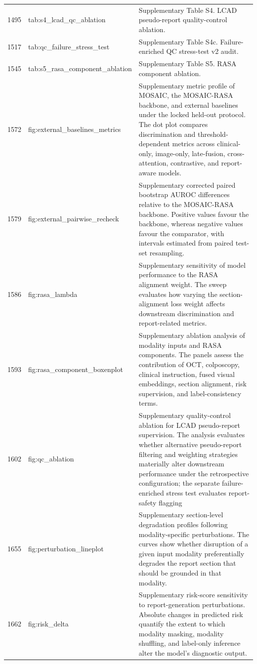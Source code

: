 \documentclass[11pt,a4paper]{article}
\begin{document}
\begin{small}
\begin{longtable}{p{1.7cm}p{4.2cm}p{9.0cm}}
1495 & tab:s4\_lcad\_qc\_ablation & Supplementary Table S4. LCAD pseudo-report quality-control ablation. \\
1517 & tab:qc\_failure\_stress\_test & Supplementary Table S4c. Failure-enriched QC stress-test v2 audit. \\
1545 & tab:s5\_rasa\_component\_ablation & Supplementary Table S5. RASA component ablation. \\
1572 & fig:external\_baselines\_metrics & Supplementary metric profile of MOSAIC, the MOSAIC-RASA backbone, and external baselines under the locked held-out protocol. The dot plot compares discrimination and threshold-dependent metrics across clinical-only, image-only, late-fusion, cross-attention, contrastive, and report-aware models. \\
1579 & fig:external\_pairwise\_recheck & Supplementary corrected paired bootstrap AUROC differences relative to the MOSAIC-RASA backbone. Positive values favour the backbone, whereas negative values favour the comparator, with intervals estimated from paired test-set resampling. \\
1586 & fig:rasa\_lambda & Supplementary sensitivity of model performance to the RASA alignment weight. The sweep evaluates how varying the section-alignment loss weight affects downstream discrimination and report-related metrics. \\
1593 & fig:rasa\_component\_boxenplot & Supplementary ablation analysis of modality inputs and RASA components. The panels assess the contribution of OCT, colposcopy, clinical instruction, fused visual embeddings, section alignment, risk supervision, and label-consistency terms. \\
1602 & fig:qc\_ablation & Supplementary quality-control ablation for LCAD pseudo-report supervision. The analysis evaluates whether alternative pseudo-report filtering and weighting strategies materially alter downstream performance under the retrospective configuration; the separate failure-enriched stress test evaluates report-safety flagging \\
1655 & fig:perturbation\_lineplot & Supplementary section-level degradation profiles following modality-specific perturbations. The curves show whether disruption of a given input modality preferentially degrades the report section that should be grounded in that modality. \\
1662 & fig:risk\_delta & Supplementary risk-score sensitivity to report-generation perturbations. Absolute changes in predicted risk quantify the extent to which modality masking, modality shuffling, and label-only inference alter the model's diagnostic output. \\

\end{longtable}
\end{small}
\end{document}
